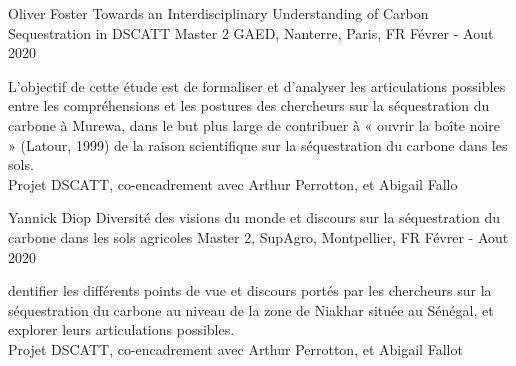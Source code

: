 \begin{cventries}
    \cventry
        {Oliver Foster} %
        {Towards an Interdisciplinary Understanding of Carbon Sequestration in
        DSCATT} %
        {Master 2 GAED, Nanterre, Paris, FR} %
        {Févrer - Aout 2020} %
        {
        \begin{cvitems} %
            L'objectif de cette étude est de formaliser et d'analyser les articulations possibles entre les compréhensions et les postures des chercheurs sur la séquestration du carbone à Murewa, dans le but plus large de contribuer à « ouvrir la boîte noire » (Latour, 1999) de la raison scientifique sur la séquestration du carbone dans les sols.\\
            Projet DSCATT, co-encadrement avec Arthur Perrotton, et Abigail Fallo
        \end{cvitems}
        }


    \cventry
        {Yannick Diop} %
        {Diversité des visions du monde et discours sur la séquestration du carbone dans les sols agricoles} %
        {Master 2, SupAgro, Montpellier, FR} %
        {Févrer - Aout 2020} %
        {
        \begin{cvitems} %
            dentifier les différents points de vue et discours portés par les chercheurs sur la séquestration du carbone au niveau de la zone de Niakhar située au Sénégal, et explorer leurs articulations possibles.\\
            Projet DSCATT, co-encadrement avec Arthur Perrotton, et Abigail Fallot
        \end{cvitems}
        }
  

 
\end{cventries}

